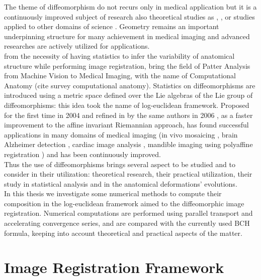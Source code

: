 The theme of diffeomorphism do not recurs only in medical application but it is a continuously improved subject of research also theoretical studies as \cite{Milnor:84:remarks}, \cite{bauer2011geodesic}, \cite{bauer2010sobolev} or studies applied to other domains of science \cite{Arnold:Khesin:14} \cite{ovsienko1992integrals}. Geometry remains an important underpinning structure for many achievement in medical imaging and advanced researches are actively utilized for applications.\\
from the necessity of having statistics to infer the variability of anatomical structure while performing image registration, bring the field of Patter Analysis from Machine Vision to Medical Imaging, with the name of Computational Anatomy (cite survey computational anatomy). 
Statistics on diffeomorphisms are introduced using a metric space defined over the Lie algebras of the Lie group of diffeomorphisms: this idea took the name of log-euclidean framework. Proposed for the first time in 2004 and refined in by the same authors in 2006 \cite{Arsigny:MRM:06}, as a faster improvement to the affine invariant Riemannian approach, has found successful applications in many domains of medical imaging (in vivo mosaicing \cite{Vercauteren:PHD:08}, brain Alzheimer detection \cite{Lorenzi:PhD:12}, cardiac image analysis \cite{Mansi:IJCV:11}, mandible imaging using polyaffine registration \cite{Seiler:MICCAI:11}) and has been continuously improved.\\
Thus the use of diffeomorphisms brings several aspect to be studied and to consider in their utilization:
theoretical research, their practical utilization, their study in statistical analysis and in the anatomical deformations' evolutions.\\
In this thesis we investigate some numerical methods to compute their composition in the log-euclidean framework aimed to the diffeomorphic image registration. Numerical computations are performed using parallel transport and accelerating convergence series, and are compared with the currently used BCH formula, keeping into account theoretical and practical aspects of the matter.



\section{Image Registration Framework}\label{se:registration_framework}

